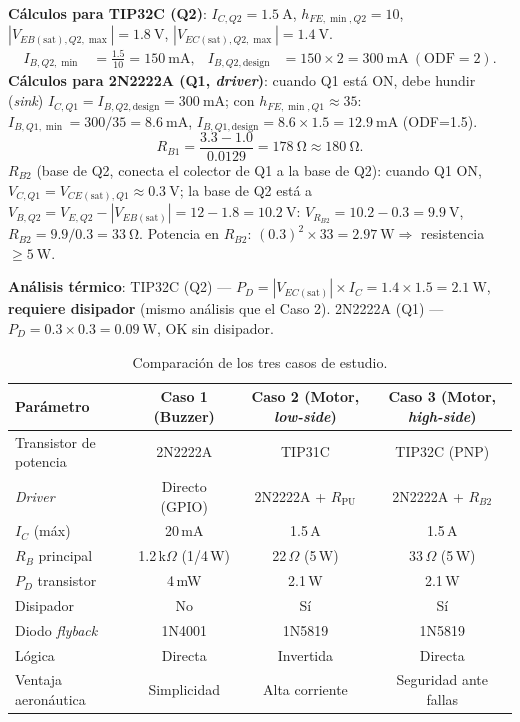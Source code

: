 \documentclass[11pt]{article}
\begin{document}
\textbf{Cálculos para TIP32C (Q2)}: $I_{C,Q2}=\SI{1.5}{\ampere}$, $h_{FE,\min,Q2}=10$,
$|V_{EB(\text{sat}),Q2,\max}|=\SI{1.8}{\volt}$, $|V_{EC(\text{sat}),Q2,\max}|=\SI{1.4}{\volt}$.
\begin{align}
  I_{B,Q2,\min} &= \frac{1.5}{10} = \SI{150}{\milli\ampere}, &
  I_{B,Q2,\text{design}} &= 150\times 2 = \SI{300}{\milli\ampere}\ (\text{ODF}=2).
\end{align}
\textbf{Cálculos para 2N2222A (Q1, \emph{driver})}: cuando Q1 está ON, debe hundir
(\emph{sink}) $I_{C,Q1}=I_{B,Q2,\text{design}}=\SI{300}{\milli\ampere}$; con
$h_{FE,\min,Q1}\approx 35$: $I_{B,Q1,\min}=300/35=\SI{8.6}{\milli\ampere}$,
$I_{B,Q1,\text{design}}=8.6\times 1.5=\SI{12.9}{\milli\ampere}$ (ODF=1.5).
\begin{equation}
  R_{B1} = \frac{3.3-1.0}{0.0129} = \SI{178}{\ohm}\approx\SI{180}{\ohm}.
\end{equation}
$R_{B2}$ (base de Q2, conecta el colector de Q1 a la base de Q2): cuando Q1 ON,
$V_{C,Q1}=V_{CE(\text{sat}),Q1}\approx\SI{0.3}{\volt}$; la base de Q2 está a
$V_{B,Q2}=V_{E,Q2}-|V_{EB(\text{sat})}|=12-1.8=\SI{10.2}{\volt}$:
$V_{R_{B2}}=10.2-0.3=\SI{9.9}{\volt}$, $R_{B2}=9.9/0.3=\SI{33}{\ohm}$.
Potencia en $R_{B2}$: $(0.3)^2\times 33=\SI{2.97}{\watt}\Rightarrow$ resistencia
$\ge\SI{5}{\watt}$.

\textbf{Análisis térmico}: TIP32C (Q2) — $P_D=|V_{EC(\text{sat})}|\times I_C=1.4\times
1.5=\SI{2.1}{\watt}$, \textbf{requiere disipador} (mismo análisis que el Caso 2). 2N2222A
(Q1) — $P_D=0.3\times 0.3=\SI{0.09}{\watt}$, OK sin disipador.

\begin{table}[H]\centering
\caption{Comparación de los tres casos de estudio.}
\begin{tabular}{lccc}
\toprule
Parámetro & Caso 1 (Buzzer) & Caso 2 (Motor, \emph{low-side}) & Caso 3 (Motor, \emph{high-side}) \\
\midrule
Transistor de potencia & 2N2222A & TIP31C & TIP32C (PNP) \\
\emph{Driver} & Directo (GPIO) & 2N2222A + $R_\text{PU}$ & 2N2222A + $R_{B2}$ \\
$I_C$ (máx) & 20\,mA & 1.5\,A & 1.5\,A \\
$R_B$ principal & 1.2\,k$\Omega$ (1/4\,W) & 22\,$\Omega$ (5\,W) & 33\,$\Omega$ (5\,W) \\
$P_D$ transistor & 4\,mW & 2.1\,W & 2.1\,W \\
Disipador & No & Sí & Sí \\
Diodo \emph{flyback} & 1N4001 & 1N5819 & 1N5819 \\
Lógica & Directa & Invertida & Directa \\
Ventaja aeronáutica & Simplicidad & Alta corriente & Seguridad ante fallas \\
\bottomrule
\end{tabular}
\end{table}
\end{document}
